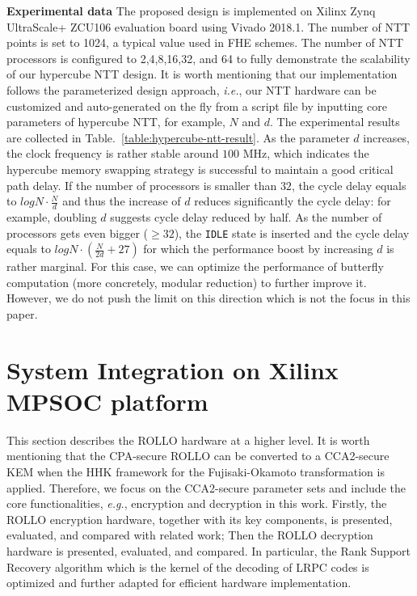 \documentclass[submission]{iacrtrans}
\theoremstyle{plain}
\begin{document}
\textbf{Experimental data} The proposed design is implemented on Xilinx Zynq UltraScale+ ZCU106 evaluation board using Vivado 2018.1. The number of NTT points is set to 1024, a typical value used in FHE schemes. The number of NTT processors is configured to 2,4,8,16,32, and 64 to fully demonstrate the scalability of our hypercube NTT design. It is worth mentioning that our implementation follows the parameterized design approach, \textit{i.e.}, our NTT hardware can be customized and auto-generated on the fly from a script file by inputting core parameters of hypercube NTT, for example, $N$ and $d$. The experimental results are collected in Table.~\ref{table:hypercube-ntt-result}. As the parameter $d$ increases, the clock frequency is rather stable around $100$ MHz, which indicates the hypercube memory swapping strategy is successful to maintain a good critical path delay. 
If the number of processors is smaller than $32$, the cycle delay equals to $logN\cdot\frac{N}{d}$ and thus the increase of $d$ reduces significantly the cycle delay: for example, doubling $d$ suggests cycle delay reduced by half. As the number of processors gets even bigger ($\geq 32$), the \texttt{IDLE} state is inserted and the cycle delay equals to $logN\cdot(\frac{N}{2d}+27)$ for which the performance boost by increasing $d$ is rather marginal.  For this case, we can optimize the performance of butterfly computation (more concretely, modular reduction) to further improve it. However, we do not push the limit on this direction which is not the focus in this paper.

\section{System Integration on Xilinx MPSOC platform}
This section describes the ROLLO hardware at a higher level. It is worth mentioning that the CPA-secure ROLLO can be converted to a CCA2-secure KEM when the HHK \cite{hofheinz2017modular} framework for the Fujisaki-Okamoto transformation is applied. Therefore, we focus on the CCA2-secure parameter sets and include the core functionalities, \textit{e.g.}, encryption and decryption in this work. Firstly, the ROLLO encryption hardware, together with its key components, is presented, evaluated, and compared with related work; Then the ROLLO decryption hardware is presented, evaluated, and compared. In particular, the Rank Support Recovery algorithm which is the kernel of the decoding of LRPC codes is optimized and further adapted for efficient hardware implementation.
\end{document}
